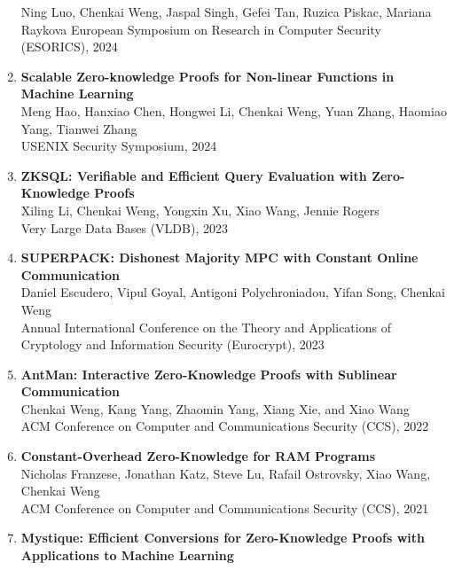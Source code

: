 \documentclass[letterpaper,11pt]{article}
\begin{document}
\begin{enumerate}[leftmargin=0.20in]
		{\small Ning Luo, Chenkai Weng, Jaspal Singh, Gefei Tan, Ruzica Piskac, Mariana Raykova \vspace{-2pt}}
		{\small European Symposium on Research in Computer Security (ESORICS), 2024}
  \item
    {\textbf{\small Scalable Zero-knowledge Proofs for Non-linear Functions in Machine Learning}} \\
		{\small Meng Hao, Hanxiao Chen, Hongwei Li, Chenkai Weng, Yuan Zhang, Haomiao Yang, Tianwei Zhang \vspace{-2pt}} \\
		{\small USENIX Security Symposium, 2024}
  \item
    {\textbf{\small ZKSQL: Verifiable and Efficient Query Evaluation with Zero-Knowledge Proofs}} \\
		{\small Xiling Li, Chenkai Weng, Yongxin Xu, Xiao Wang, Jennie Rogers \vspace{-2pt}} \\
    {\small Very Large Data Bases (VLDB), 2023}
  \item
    {\textbf{\small SUPERPACK: Dishonest Majority MPC with Constant Online Communication}} \\
		{\small Daniel Escudero, Vipul Goyal, Antigoni Polychroniadou, Yifan Song, Chenkai Weng \vspace{-2pt}} \\
    {\small Annual International Conference on the Theory and Applications of Cryptology and Information Security (Eurocrypt), 2023}
  \item
    {\textbf{\small AntMan: Interactive Zero-Knowledge Proofs with Sublinear Communication}} \\
		{\small Chenkai Weng, Kang Yang, Zhaomin Yang, Xiang Xie, and Xiao Wang \vspace{-2pt}} \\
		{\small ACM Conference on Computer and Communications Security (CCS), 2022}
  \item
    {\textbf{\small Constant-Overhead Zero-Knowledge for RAM Programs}} \\
		{\small Nicholas Franzese, Jonathan Katz, Steve Lu, Rafail Ostrovsky, Xiao Wang, Chenkai Weng \vspace{-2pt}} \\
		{\small ACM Conference on Computer and Communications Security (CCS), 2021}
  \item
    {\textbf{\small Mystique: Efficient Conversions for Zero-Knowledge Proofs with Applications to Machine Learning}} \\

\end{enumerate}
\end{document}
